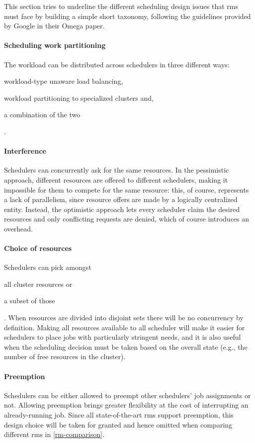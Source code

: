 This section tries to underline the different scheduling design issues that \glspl{rm} must face by building a simple short taxonomy, following the guidelines provided by Google in their Omega \cite{omega} paper.

\paragraph{Scheduling work partitioning}
The workload can be distributed across schedulers in three different ways:
\begin{mylist}
    \item workload-type unaware load balancing,
    \item workload partitioning to specialized clusters and,
    \item a combination of the two
\end{mylist}.

\paragraph{Interference}
Schedulers can concurrently ask for the same resources.
In the pessimistic approach, different resources are offered to different schedulers, making it impossible for them to compete for the same resource: this, of course, represents a lack of parallelism, since resource offers are made by a logically centralized entity.
Instead, the optimistic approach lets every scheduler claim the desired resources and only conflicting requests are denied, which of course introduces an overhead.

\paragraph{Choice of resources}
Schedulers can pick amongst
\begin{mylist}
    \item all cluster resources or 
    \item a subset of those
\end{mylist}.
When resources are divided into disjoint sets there will be no concurrency by definition.
Making all resources available to all scheduler will make it easier for schedulers to place jobs with particularly stringent needs, and it is also useful when the scheduling decision must be taken based on the overall state (e.g., the number of free resources in the cluster).

\paragraph{Preemption}
Schedulers can be either allowed to preempt other schedulers' job assignments or not.
Allowing preemption brings greater flexibility at the cost of interrupting an already-running job.
Since all state-of-the-art \glspl{rm} support preemption, this design choice will be taken for granted and hence omitted when comparing different \glspl{rm} in \autoref{rm-comparison}.

